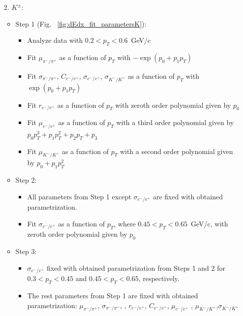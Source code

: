 \begin{enumerate}
	\item[2.] $K^\pm$:
	\begin{itemize}
		\item Step 1 (Fig. ~\ref{fig:dEdx_fit_parametersK}):
		\begin{itemize}
			\renewcommand\labelitemi{--}
			\item Analyze data with $0.2 < p_T < 0.6$~GeV/c
			\item Fit  $\mu_{\pi^-/\pi^+}$  as a function of $p_T$ with $-\exp\left(p_0+p_1p_T\right)$
			\item Fit $\sigma_{\pi^-/\pi^+}$, $C_{e^-/e^+}$, $\sigma_{e^-/e^+}$, $\sigma_{K^-/K^+}$ as a function of $p_T$ with $\exp\left(p_0+p_1p_T\right)$
			\item Fit $r_{e^-/e^+}$ as a function of $p_T$ with zeroth order polynomial given by $p_0$ 
			\item Fit $\mu_{e^-/e^+}$ as a function of $p_T$ with a third order polynomial given by $p_0p_T^3+p_1p_T^2+p_2p_T+p_3$
			\item Fit $\mu_{K^-/K^+}$ as a function of $p_T$ with a second order polynomial given by $p_0+p_1p_T^2$
			
		\end{itemize}
		\item Step 2:
		\begin{itemize}
			\renewcommand\labelitemi{--}
			\item All parameters from Step 1 except $\sigma_{e^-/e^+}$ are fixed with obtained parametrization.
			\item  Fit $\sigma_{e^-/e^+}$ as a function of $p_T$, where $0.45<p_T<0.65$~GeV/c, with zeroth order polynomial given by $p_0$ 
			
		\end{itemize}
		\item Step 3:
		\begin{itemize}
			\renewcommand\labelitemi{--}
			\item  $\sigma_{e^-/e^+}$ fixed with obtained parametrization from Steps 1 and 2 for $0.3<p_T<0.45$ and $0.45<p_T<0.65$, respectively.
			\item  The rest parameters from Step 1 are fixed with obtained parametrization: $\mu_{\pi^-/\pi^+}$, $\sigma_{\pi^-/\pi^+}$, , $r_{e^-/e^+}$, $C_{e^-/e^+}$, $\mu_{e^-/e^+}$ , $\mu_{K^-/K^+}$,$\sigma_{K^-/K^+}$
		\end{itemize}		
	\end{itemize}		
\end{enumerate} 

